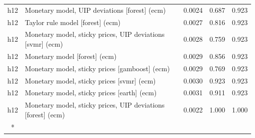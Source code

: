 \begin{ThreePartTable}
\begin{longtable}[t]{cp{5.5cm}ccc}
h12 & \raggedright Monetary model, UIP deviations [forest] (ecm) & 0.0024 & 0.687 & 0.923\\
h12 & \raggedright Taylor rule model [forest] (ecm) & 0.0027 & 0.816 & 0.923\\
h12 & \raggedright Monetary model, sticky prices, UIP deviations [svmr] (ecm) & 0.0028 & 0.759 & 0.923\\
h12 & \raggedright Monetary model [forest] (ecm) & 0.0029 & 0.856 & 0.923\\
h12 & \raggedright Monetary model, sticky prices [gamboost] (ecm) & 0.0029 & 0.769 & 0.923\\
h12 & \raggedright Monetary model, sticky prices [svmr] (ecm) & 0.0030 & 0.923 & 0.923\\
h12 & \raggedright Monetary model, sticky prices [earth] (ecm) & 0.0031 & 0.911 & 0.923\\
h12 & \raggedright Monetary model, sticky prices, UIP deviations [forest] (ecm) & 0.0022 & 1.000 & 1.000\\*
\end{longtable}
\end{ThreePartTable}
\endgroup{}
